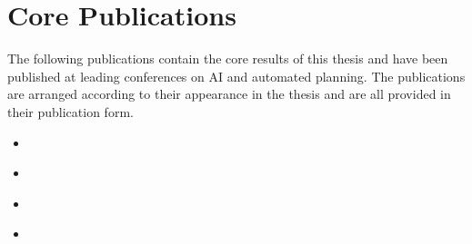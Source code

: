 \renewcommand{\citebf}[1]{\textbf{#1}}

\chapter{Core Publications}\label{chapter:core_publications}
The following publications contain the core results of this thesis and have been published at leading conferences on AI and automated planning. 
The publications are arranged according to their appearance in the thesis and are all provided in their publication form.

\cleartoleftpage
\vspace*{\fill}
\begin{itemize}
  \item {}
\end{itemize}
\vspace*{\fill}
\clearpage


\cleartoleftpage
\vspace*{\fill}
\begin{itemize}
  \item {}
\end{itemize}
\vspace*{\fill}
\clearpage


\cleartoleftpage
\vspace*{\fill}
\renewcommand{\citeaddendum}{\\\textbf{(Best Student Paper Runner-Up Award)}}
\begin{itemize}
  \item {}
\end{itemize}
\renewcommand{\citeaddendum}{}
\vspace*{\fill}
\clearpage


\cleartoleftpage
\vspace*{\fill}
\renewcommand{\citeaddendum}{\\\textbf{(Partly based on ideas from my master thesis)}}
\begin{itemize}
  \item {}
\end{itemize}
\renewcommand{\citeaddendum}{}
\vspace*{\fill}
\clearpage


